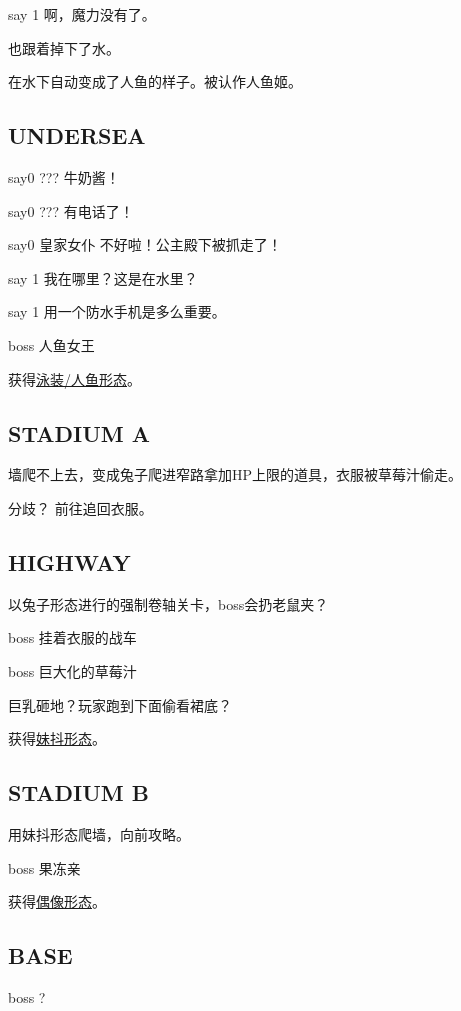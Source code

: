 \documentclass{article}
\begin{document}
say 1 啊，魔力没有了。

也跟着掉下了水。

在水下自动变成了人鱼的样子。被认作人鱼姬。

\subsection{UNDERSEA}

say0 ??? 牛奶酱！

say0 ??? 有电话了！

say0 皇家女仆 不好啦！公主殿下被抓走了！

say 1 我在哪里？这是在水里？

say 1 用一个防水手机是多么重要。

boss 人鱼女王

获得\hyperref[costume_mermaid]{泳装/人鱼形态}。

\subsection{STADIUM A}

墙爬不上去，变成兔子爬进窄路拿加HP上限的道具，衣服被草莓汁偷走。

分歧？ 前往追回衣服。

\subsection{HIGHWAY}

以兔子形态进行的强制卷轴关卡，boss会扔老鼠夹？

boss 挂着衣服的战车

boss 巨大化的草莓汁

巨乳砸地？玩家跑到下面偷看裙底？

获得\hyperref[costume_maid]{妹抖形态}。

\subsection{STADIUM B}

用妹抖形态爬墙，向前攻略。

boss 果冻亲

获得\hyperref[costume_idol]{偶像形态}。



\subsection{BASE}

boss ?
\end{document}
